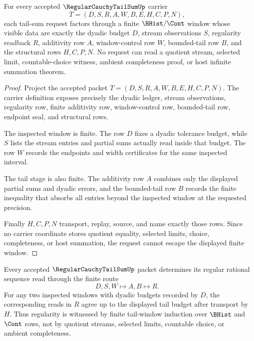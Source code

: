 \begin{theorem}
\label{thm:regular-cauchy-tail-sum-window}
For every accepted $\RegularCauchyTailSumUp$ carrier
$$
T=(D,S,R,A,W,B,E,H,C,P,N),
$$
each tail-sum request factors through a finite $\BHist/\Cont$ window whose visible data are exactly the dyadic budget $D$, stream observations $S$, regularity readback $R$, additivity row $A$, window-control row $W$, bounded-tail row $B$, and the structural rows $H,C,P,N$. No request can read a quotient stream, selected limit, countable-choice witness, ambient completeness proof, or host infinite summation theorem.
\end{theorem}

\begin{proof}
Project the accepted packet $T=(D,S,R,A,W,B,E,H,C,P,N)$. The carrier definition exposes precisely the dyadic ledger, stream observations, regularity row, finite additivity row, window-control row, bounded-tail row, endpoint seal, and structural rows.

The inspected window is finite. The row $D$ fixes a dyadic tolerance budget, while $S$ lists the stream entries and partial sums actually read inside that budget. The row $W$ records the endpoints and width certificates for the same inspected interval.

The tail stage is also finite. The additivity row $A$ combines only the displayed partial sums and dyadic errors, and the bounded-tail row $B$ records the finite inequality that absorbs all entries beyond the inspected window at the requested precision.

Finally $H,C,P,N$ transport, replay, source, and name exactly those rows. Since no carrier coordinate stores quotient equality, selected limits, choice, completeness, or host summation, the request cannot escape the displayed finite window.
\end{proof}

\begin{theorem}
\label{thm:regular-cauchy-tail-sum-regseq}
Every accepted $\RegularCauchyTailSumUp$ packet determines its regular rational sequence read through the finite route
$$
D,S,W \longmapsto A,B \longmapsto R .
$$
For any two inspected windows with dyadic budgets recorded by $D$, the corresponding reads in $R$ agree up to the displayed tail budget after transport by $H$. Thus regularity is witnessed by finite tail-window induction over $\BHist$ and $\Cont$ rows, not by quotient streams, selected limits, countable choice, or ambient completeness.
\end{theorem}

